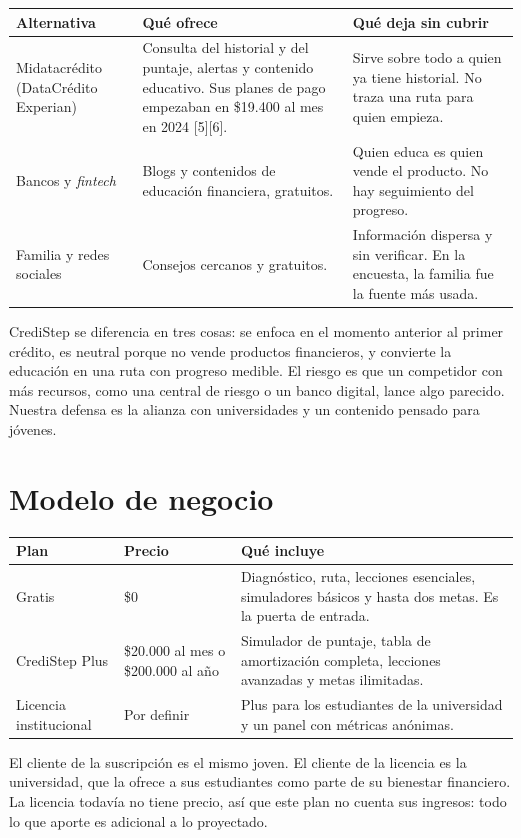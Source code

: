 \documentclass[11pt,a4paper]{article}
\begin{document}
\begin{tabularx}{\textwidth}{P{2.9cm} Y Y}
  \toprule
  \textbf{Alternativa} & \textbf{Qué ofrece} & \textbf{Qué deja sin cubrir} \\
  \midrule
  Midatacrédito (DataCrédito Experian) & Consulta del historial y del puntaje, alertas y contenido educativo. Sus planes de pago empezaban en \$19.400 al mes en 2024 [5][6]. & Sirve sobre todo a quien ya tiene historial. No traza una ruta para quien empieza. \\
  Bancos y \textit{fintech} & Blogs y contenidos de educación financiera, gratuitos. & Quien educa es quien vende el producto. No hay seguimiento del progreso. \\
  Familia y redes sociales & Consejos cercanos y gratuitos. & Información dispersa y sin verificar. En la encuesta, la familia fue la fuente más usada. \\
  \bottomrule
\end{tabularx}

CrediStep se diferencia en tres cosas: se enfoca en el momento anterior al primer crédito, es neutral porque no vende productos financieros, y convierte la educación en una ruta con progreso medible. El riesgo es que un competidor con más recursos, como una central de riesgo o un banco digital, lance algo parecido. Nuestra defensa es la alianza con universidades y un contenido pensado para jóvenes.

\section{Modelo de negocio}

\begin{tabularx}{\textwidth}{P{2.6cm} P{3.2cm} Y}
  \toprule
  \textbf{Plan} & \textbf{Precio} & \textbf{Qué incluye} \\
  \midrule
  Gratis & \$0 & Diagnóstico, ruta, lecciones esenciales, simuladores básicos y hasta dos metas. Es la puerta de entrada. \\
  CrediStep Plus & \$20.000 al mes o \$200.000 al año & Simulador de puntaje, tabla de amortización completa, lecciones avanzadas y metas ilimitadas. \\
  Licencia institucional & Por definir & Plus para los estudiantes de la universidad y un panel con métricas anónimas. \\
  \bottomrule
\end{tabularx}

El cliente de la suscripción es el mismo joven. El cliente de la licencia es la universidad, que la ofrece a sus estudiantes como parte de su bienestar financiero. La licencia todavía no tiene precio, así que este plan no cuenta sus ingresos: todo lo que aporte es adicional a lo proyectado.
\end{document}
